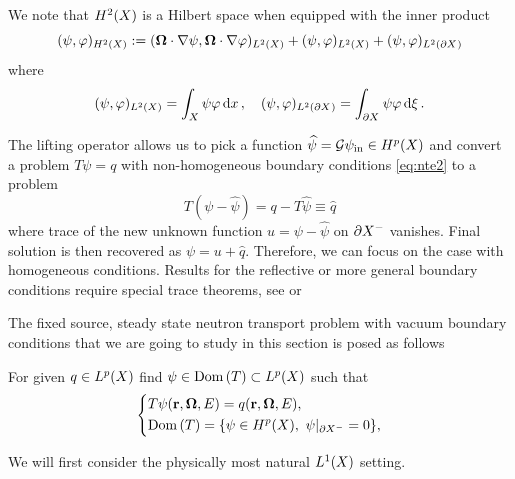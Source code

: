 %
We note that $\Hp[2](X)$ is a Hilbert space when equipped with the inner product
\begin{equation*}\label{eq:ip}
	\ip{\Hp[2](X)}{\psi,\varphi} := \ip{\Lp[2](X)}{\bomega\cdot\nabla \psi, \bomega\cdot\nabla \varphi} +
	\ip{\Lp[2](X)}{\psi,\varphi} +
	\ip{\Lp[2](\pX)}{\psi,\varphi} 	
\end{equation*}
where
\begin{equation}\label{eq:ipL2}
	\ip{\Lp[2](X)}{\psi,\varphi} = \int_X \psi \varphi \,\d{x},\quad
	\ip{\Lp[2](\pX)}{\psi,\varphi} = \int_{\pX} \psi \varphi \,\d{\xi}.
\end{equation}

\begin{remark}\label{rem:lifting}
The lifting operator allows us to pick a function $\widehat \psi = \mathcal{G}\psi_{\text{in}} \in \Hp(X)$ and convert a
problem $T\psi = q$ with non-homogeneous boundary conditions \eqref{eq:nte2} to a problem 
$$
	T(\psi - \widehat\psi) = q - T\widehat\psi \equiv \widehat q
$$ 
where trace of the new unknown function $u = \psi - \widehat\psi$ on $\pX[-]$ vanishes. Final solution is then recovered
as $\psi = u + \widehat{q}$. Therefore, we can focus on the case with homogeneous conditions. Results for the reflective or more general
boundary conditions require special trace theorems, see \cite[Chap. XXI, Appendix of \S2]{DautrayLions} or \cite[Chap. 2]{Agoshkov} 
\end{remark}

The fixed source, steady state neutron transport problem with vacuum boundary conditions that we are going to study in
this section is posed as follows

\begin{problem}\label{prb:1}
For given $q\in \Lp(X)$ find $\psi \in \Dom{T} \subset \Lp(X)$ such that
$$
  \left\{
  \begin{aligned}
     &T\psi(\br,\bomega,E) = q(\br,\bomega,E),\\
     &\Dom{T} = \{\psi\in \Hp(X),\ \psi\vert_{\pX[-]} = 0\},
  \end{aligned}
  \right.
$$
\end{problem}

We will first consider the physically most natural $\Lp[1](X)$ setting.

